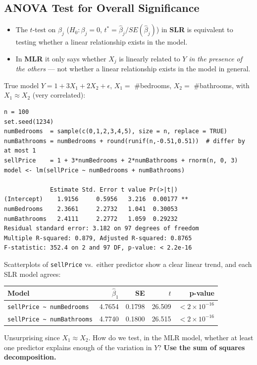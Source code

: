 \subsection{ANOVA Test for Overall Significance}

\begin{remark}
    \begin{itemize}
        \item The $t$-test on $\beta_j$ ($H_0:\beta_j=0$, $t^*=\hat\beta_j/SE(\hat\beta_j)$) in
        \textbf{SLR} is equivalent to testing whether a linear relationship exists in the model.
        \item In \textbf{MLR} it only says whether $X_j$ is linearly related to $Y$ \emph{in the
        presence of the others} --- not whether a linear relationship exists in the model in general.
    \end{itemize}
\end{remark}

\begin{example}
    True model $Y=1+3X_1+2X_2+\epsilon$, $X_1=$ \#bedrooms, $X_2=$ \#bathrooms, with
    $X_1\approx X_2$ (very correlated):
\begin{verbatim}
n = 100
set.seed(1234)
numBedrooms  = sample(c(0,1,2,3,4,5), size = n, replace = TRUE)
numBathrooms = numBedrooms + round(runif(n,-0.51,0.51))  # differ by at most 1
sellPrice    = 1 + 3*numBedrooms + 2*numBathrooms + rnorm(n, 0, 3)
model <- lm(sellPrice ~ numBedrooms + numBathrooms)

             Estimate Std. Error t value Pr(>|t|)
(Intercept)    1.9156     0.5956   3.216  0.00177 **
numBedrooms    2.3661     2.2732   1.041  0.30053
numBathrooms   2.4111     2.2772   1.059  0.29232
Residual standard error: 3.182 on 97 degrees of freedom
Multiple R-squared: 0.879, Adjusted R-squared: 0.8765
F-statistic: 352.4 on 2 and 97 DF, p-value: < 2.2e-16
\end{verbatim}
     Scatterplots
    of \texttt{sellPrice} vs.\ either predictor show a clear linear trend, and each SLR model
    agrees:
    \begin{center}
        \begin{tabular}{lrrrr}
            \toprule
            Model & $\hat\beta_1$ & SE & $t$ & p-value \\
            \midrule
            \texttt{sellPrice \textasciitilde{} numBedrooms} & 4.7654 & 0.1798 & 26.509 & $<2\times10^{-16}$ \\
            \texttt{sellPrice \textasciitilde{} numBathrooms} & 4.7740 & 0.1800 & 26.515 & $<2\times10^{-16}$ \\
            \bottomrule
        \end{tabular}
    \end{center}
    Unsurprising since $X_1\approx X_2$. How do we test, in the MLR model, whether at least one
    predictor explains enough of the variation in $Y$? \textbf{Use the sum of squares decomposition.}
\end{example}

